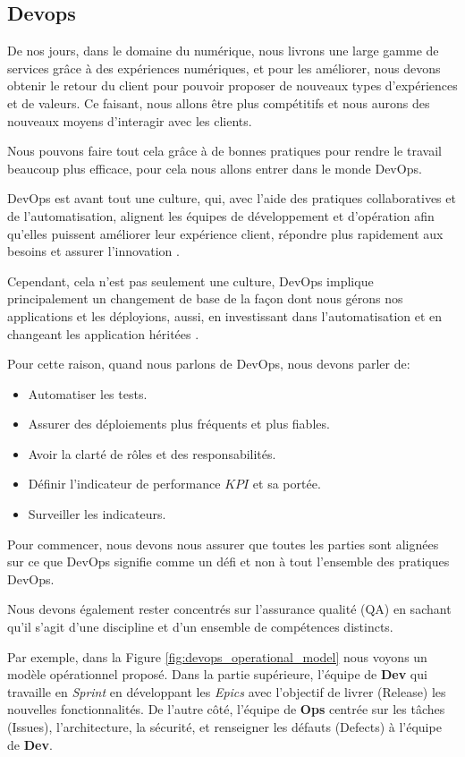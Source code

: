 \subsection{Devops}\label{sec:devops}
De nos jours, dans le domaine du numérique, nous livrons une large gamme de services grâce à des expériences numériques, et pour les améliorer, nous devons obtenir le retour du client pour pouvoir proposer de nouveaux types d’expériences et de valeurs. Ce faisant, nous allons être plus compétitifs et nous aurons des nouveaux moyens d'interagir avec les clients.

Nous pouvons faire tout cela grâce à de bonnes pratiques pour rendre le travail beaucoup plus efficace, pour cela nous allons entrer dans le monde DevOps.

DevOps est avant tout une culture, qui, avec l'aide des pratiques collaboratives et de l'automatisation, alignent les équipes de développement et d'opération afin qu'elles puissent améliorer leur expérience client, répondre plus rapidement aux besoins et assurer l'innovation \cite{IsaacSacolick2016DrivingCulture}.

Cependant, cela n'est pas seulement une culture, DevOps implique principalement un changement de base de la façon dont nous gérons nos applications et les déployions, aussi, en investissant dans l'automatisation et en changeant les application héritées \cite{benjamin_wootton}.

Pour cette raison, quand nous parlons de DevOps, nous devons parler de:

\begin{itemize}
\item Automatiser les tests.
\item Assurer des déploiements plus fréquents et plus fiables.
\item Avoir la clarté de rôles et des responsabilités.
\item Définir l'indicateur de performance \(KPI\) et sa portée.
\item Surveiller les indicateurs.
\end{itemize}

Pour commencer, nous devons nous assurer que toutes les parties sont alignées sur ce que DevOps signifie comme un défi et non à tout l’ensemble des pratiques DevOps.

Nous devons également rester concentrés sur l’assurance qualité (QA) en sachant qu’il s’agit d’une discipline et d’un ensemble de compétences distincts.

Par exemple, dans la Figure \ref{fig:devops_operational_model} nous voyons un modèle opérationnel proposé. Dans la partie supérieure, l'équipe de \textbf{Dev} qui travaille en \textit{Sprint} en développant les \textit{Epics} avec l'objectif de livrer (Release) les nouvelles fonctionnalités. De l'autre côté, l'équipe de \textbf{Ops} centrée sur les tâches (Issues), l'architecture, la sécurité, et renseigner les défauts (Defects) à l'équipe de \textbf{Dev}.



